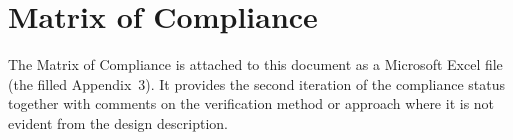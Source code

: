 %
%

\section{Matrix of Compliance}
\label{sec:moc}

The Matrix of Compliance is attached to this document as a Microsoft Excel
file (the filled Appendix~3). It provides the second iteration of the
compliance status together with comments on the verification method or
approach where it is not evident from the design description.



